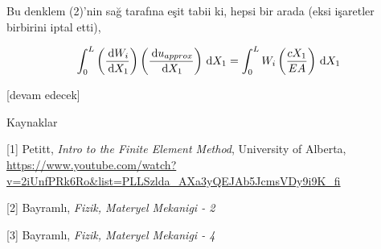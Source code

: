 \documentclass[12pt,fleqn]{article}\usepackage{../../common}
\begin{document}
Bu denklem (2)'nin sağ tarafına eşit tabii ki, hepsi bir arada (eksi
işaretler birbirini iptal etti),

$$
\int_{0}^{L} \left( \frac{\,\mathrm{d} W_i}{\,\mathrm{d} X_1}  \right)
\left( \frac{\,\mathrm{d} u_{approx}}{\,\mathrm{d} X_1}\right) \,\mathrm{d} X_1 =
\int_{0}^{L} W_i  \left( \frac{c X_1}{EA} \right) \,\mathrm{d} X_1
$$




[devam edecek]

Kaynaklar

[1] Petitt, {\em Intro to the Finite Element Method}, University of Alberta,
    \url{https://www.youtube.com/watch?v=2iUnfPRk6Ro&list=PLLSzlda_AXa3yQEJAb5JcmsVDy9i9K_fi}

[2] Bayramlı, {\em Fizik, Materyel Mekanigi - 2}
    
[3] Bayramlı, {\em Fizik, Materyel Mekanigi - 4}
    
\end{document}
